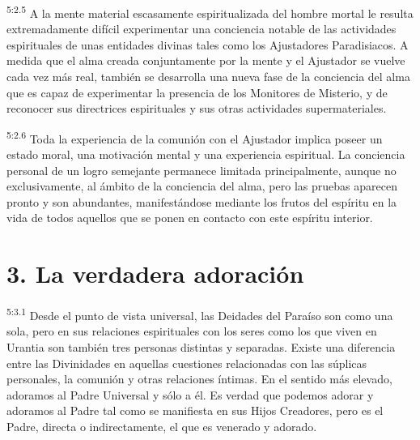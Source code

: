 \par
\textsuperscript{5:2.5} A la mente material escasamente espiritualizada del hombre mortal le resulta extremadamente difícil experimentar una conciencia notable de las actividades espirituales de unas entidades divinas tales como los Ajustadores Paradisiacos. A medida que el alma creada conjuntamente por la mente y el Ajustador se vuelve cada vez más real, también se desarrolla una nueva fase de la conciencia del alma que es capaz de experimentar la presencia de los Monitores de Misterio, y de reconocer sus directrices espirituales y sus otras actividades supermateriales.

\par
\textsuperscript{5:2.6} Toda la experiencia de la comunión con el Ajustador implica poseer un estado moral, una motivación mental y una experiencia espiritual. La conciencia personal de un logro semejante permanece limitada principalmente, aunque no exclusivamente, al ámbito de la conciencia del alma, pero las pruebas aparecen pronto y son abundantes, manifestándose mediante los frutos del espíritu en la vida de todos aquellos que se ponen en contacto con este espíritu interior.

\section*{3. La verdadera adoración}
\par
\textsuperscript{5:3.1} Desde el punto de vista universal, las Deidades del Paraíso son como una sola, pero en sus relaciones espirituales con los seres como los que viven en Urantia son también tres personas distintas y separadas. Existe una diferencia entre las Divinidades en aquellas cuestiones relacionadas con las súplicas personales, la comunión y otras relaciones íntimas. En el sentido más elevado, adoramos al Padre Universal y sólo a él. Es verdad que podemos adorar y adoramos al Padre tal como se manifiesta en sus Hijos Creadores, pero es el Padre, directa o indirectamente, el que es venerado y adorado.


